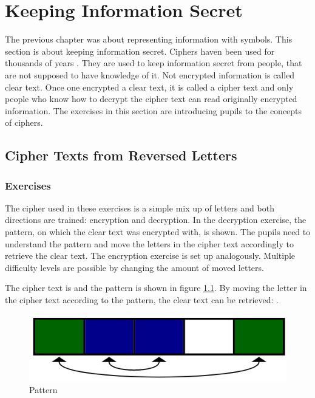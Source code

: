 \chapter{Keeping Information Secret}
\label{chapter:keepingInformationSecret}

The previous chapter  was about representing information with symbols. This section is about keeping information secret.
Ciphers haven been used for thousands of years \cite{HistoryOfCryptography}. They are used to keep information secret from people, that are not supposed to have knowledge of it. Not encrypted information is called clear text. Once one encrypted a clear text, it is called a cipher text and only people who know how to decrypt the cipher text can read originally encrypted information.
The exercises in this section are introducing pupils to the concepts of ciphers.

\section{Cipher Texts from Reversed Letters}
\label{section:patterns}

\subsection{Exercises}
The cipher used in these exercises is a simple mix up of letters and both directions are trained: encryption and decryption. In the decryption exercise, the pattern, on which the clear text was encrypted with, is shown. The pupils need to understand the pattern and move the letters in the cipher text accordingly to retrieve the clear text. The encryption exercise is set up analogously. Multiple difficulty levels are possible by changing the amount of moved letters.

\begin{example}
    The cipher text is  and the pattern is shown in figure \ref{fig:pattern}. By moving the letter in the cipher text according to the pattern, the clear text can be retrieved: .
\end{example}

\begin{figure} 
    \centering
    \includegraphics[width=0.4 \columnwidth]{figures/pattern.png}
    \caption{Pattern} 
    \label{fig:pattern} 
\end{figure}


